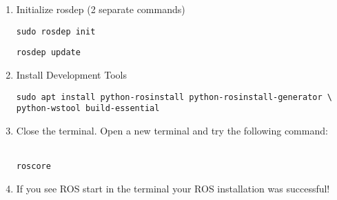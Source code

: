 \documentclass[12pt]{article}
\begin{document}
\begin{enumerate}
\newpage
	
	\item Initialize rosdep (2 separate commands) 
	\begin{verbatim}
sudo rosdep init
	\end{verbatim}
	\begin{verbatim} 
rosdep update
	\end{verbatim}



		
\item Install Development Tools 
\begin{verbatim} 
sudo apt install python-rosinstall python-rosinstall-generator \ 
python-wstool build-essential
\end{verbatim}

		\item Close the terminal. Open a new terminal and try the following command:\\\\
\begin{verbatim}  
roscore 
\end{verbatim}

		\item If you see ROS start in the terminal your ROS installation was successful!\\\\

\end{enumerate}
\end{document}

